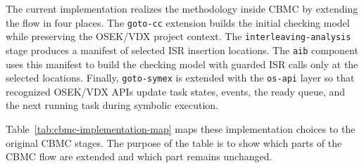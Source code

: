 The current implementation realizes the methodology inside CBMC by extending the flow in four places.
The \texttt{goto-cc} extension builds the initial checking model while preserving the OSEK/VDX project context. 
The \texttt{interleaving-analysis} stage produces a manifest of selected ISR insertion locations. 
The \texttt{aib} component uses this manifest to build the checking model with guarded ISR calls only at the selected locations. 
Finally, \texttt{goto-symex} is extended with the \texttt{os-api} layer so that recognized OSEK/VDX APIs update task states, events, the ready queue, and the next running task during symbolic execution.

Table~\ref{tab:cbmc-implementation-map} maps these implementation choices to the original CBMC stages. The purpose of the table is to show which parts of the CBMC flow are extended and which part remains unchanged.

